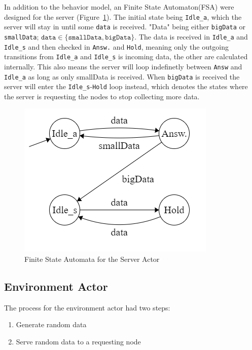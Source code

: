 In addition to the behavior model, an Finite State Automaton(FSA) were designed for the server (Figure~\ref{fig:server_states}). The initial state being \texttt{Idle\_a}, which the server will stay in until some \texttt{data} is received. "Data" being either \texttt{bigData} or \texttt{smallData}; $ \texttt{data} \in \{ \texttt{smallData}, \texttt{bigData} \} $. The data is received in \texttt{Idle\_a} and \texttt{Idle\_s} and then checked in \texttt{Answ.} and \texttt{Hold}, meaning only the outgoing transitions from \texttt{Idle\_a} and \texttt{Idle\_s} is incoming data, the other are calculated internally. This also means the server will loop indefinetly between \texttt{Answ} and \texttt{Idle\_a} as long as only smallData is received. When \texttt{bigData} is received the server will enter the \texttt{Idle\_s}-\texttt{Hold} loop instead, which denotes the states where the server is requesting the nodes to stop collecting more data. 


\begin{figure}[ht]
    \includegraphics{include/figures/server_actor_fsm}
    \caption{Finite State Automata for the Server Actor}
    \label{fig:server_states}
\end{figure}

\subsection{Environment Actor}

The process for the environment actor had two steps:

\begin{enumerate}
\item Generate random data
\item Serve random data to a requesting node 
\end{enumerate}

